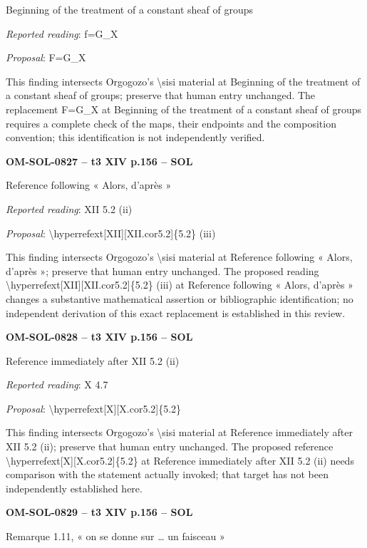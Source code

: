 Beginning of the treatment of a constant sheaf of groups\par
\emph{Reported reading}: f=\allowbreak G\_X\par
\emph{Proposal}: F=\allowbreak G\_X\par
This finding intersects Orgogozo's \textbackslash{}sisi material at Beginning of the treatment of a constant sheaf of groups; preserve that human entry unchanged. The replacement F=\allowbreak G\_X at Beginning of the treatment of a constant sheaf of groups requires a complete check of the maps, their endpoints and the composition convention; this identification is not independently verified.\par
\par\noindent\textbf{OM-SOL-0827 -- t3 XIV p.156 -- SOL}\par
Reference following « Alors, d'après »\par
\emph{Reported reading}: XII 5.2 (ii)\par
\emph{Proposal}: \textbackslash{}hyperrefext[XII][XII.cor5.2]\{5.2\} (iii)\par
This finding intersects Orgogozo's \textbackslash{}sisi material at Reference following « Alors, d'après »; preserve that human entry unchanged. The proposed reading \textbackslash{}hyperrefext[XII][XII.cor5.2]\{5.2\} (iii) at Reference following « Alors, d'après » changes a substantive mathematical assertion or bibliographic identification; no independent derivation of this exact replacement is established in this review.\par
\par\noindent\textbf{OM-SOL-0828 -- t3 XIV p.156 -- SOL}\par
Reference immediately after XII 5.2 (ii)\par
\emph{Reported reading}: X 4.7\par
\emph{Proposal}: \textbackslash{}hyperrefext[X][X.cor5.2]\{5.2\}\par
This finding intersects Orgogozo's \textbackslash{}sisi material at Reference immediately after XII 5.2 (ii); preserve that human entry unchanged. The proposed reference \textbackslash{}hyperrefext[X][X.cor5.2]\{5.2\} at Reference immediately after XII 5.2 (ii) needs comparison with the statement actually invoked; that target has not been independently established here.\par
\par\noindent\textbf{OM-SOL-0829 -- t3 XIV p.156 -- SOL}\par
Remarque 1.11, « on se donne sur … un faisceau »\par
